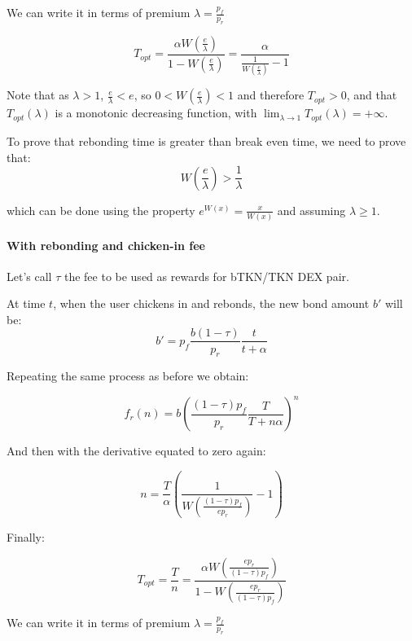 \documentclass{article}
\begin{document}
We can write it in terms of premium $\lambda = \frac{p_f}{p_r}$

\begin{equation}
  \label{eq:opt-rebonding-premium}
T_{opt} = \frac{\alpha W\left(\frac{e}{\lambda}\right)}{1 - W\left(\frac{e}{\lambda}\right)} = \frac{\alpha}{\frac{1}{W\left(\frac{e}{\lambda}\right)} - 1}
\end{equation}

Note that as $\lambda > 1$, $\frac{e}{\lambda} < e$, so $0 < W(\frac{e}{\lambda}) < 1$ and therefore $T_{opt} > 0$, and that $T_{opt}(\lambda)$ is a monotonic decreasing function, with $\lim_{\lambda \rightarrow 1}T_{opt}(\lambda) = +\infty$.

To prove that rebonding time is greater than break even time, we need to prove that:
\[
W\left(\frac{e}{\lambda}\right) > \frac{1}{\lambda}
\]

which can be done using the property $e^{W(x)} = \frac{x}{W(x)}$ and assuming $\lambda \ge 1$.

\paragraph{With rebonding and chicken-in fee}
Let’s call $\tau$ the fee to be used as rewards for bTKN/TKN DEX pair.

At time $t$, when the user chickens in and rebonds, the new bond amount $b'$ will be:
\begin{equation}
b'= p_f\frac{b(1-\tau)}{p_r}\frac{t}{t+\alpha}
\end{equation}

Repeating the same process as before we obtain:

\begin{equation}
  \label{eq:n-rebond_3}
f_r(n) = b \left(\frac{(1-\tau)p_f}{p_r} \frac{T}{T+n \alpha} \right)^{n}
\end{equation}

And then with the derivative equated to zero again:

\[
n = \frac{T}{\alpha} \left(\frac{1}{W\left(\frac{(1-\tau)p_f}{e p_r} \right)} - 1\right)
\]

Finally:

\begin{equation}
  \label{}
T_{opt} = \frac{T}{n} = \frac{\alpha W\left(\frac{e p_r}{(1-\tau)p_f}\right)}{1 - W\left(\frac{e p_r}{(1-\tau)p_f}\right)}
\end{equation}

We can write it in terms of premium $\lambda = \frac{p_f}{p_r}$
\end{document}
